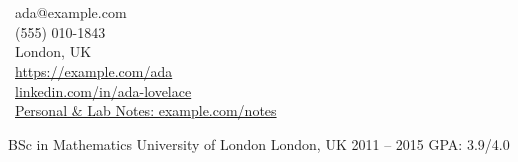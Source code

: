 \documentclass[]{awesome-cv}
\begin{document}
      \begin{center}
        \\
       \\
      \vspace{2mm}
      {\faEnvelope\ ada@example.com} \\
{\faMobile\ (555) 010-1843} \\
{\faMapMarker\ London, UK} \\
{\faLink\ \href{https://example.com/ada}{https://example.\allowbreak{}com/\allowbreak{}ada}} \\
{\faLink\ \href{https://linkedin.com/in/ada-lovelace}{linkedin.\allowbreak{}com/\allowbreak{}in/\allowbreak{}ada-\allowbreak{}lovelace}} \\
{\faLink\ \href{https://example.com/notes}{Personal \& Lab Notes: example.\allowbreak{}com/\allowbreak{}notes}}
      \\ \vspace{6.0mm} 
      \end{center}
    \vspace{3pt}
    \begin{cventries}
    \cventry
{BSc in Mathematics}
{University of London}
{London, UK}
{2011 – 2015}
{GPA: 3.9/4.0}
    \end{cventries}
\end{document}
